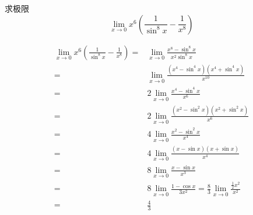 \documentclass[color=green,titlestyle=hang]{elegantbook}%
\begin{document}
\begin{exercise}
求极限\begin{equation*}\lim_{x\to 0}x^6\left(\frac{1}{\sin^8x}-\frac{1}{x^8}\right)\end{equation*}
\end{exercise}\begin{Solution}\begin{align*}
\lim_{x\to 0}x^6\left(\frac{1}{\sin^8x}-\frac{1}{x^8}\right)=&\lim_{x\to 0}\frac{x^8-\sin^8x}{x^2\sin^{8}x}\\
=&\lim_{x\to 0}\frac{(x^4-\sin^4x)(x^4+\sin^4x)}{x^{10}}\\
=&2\lim_{x\to 0}\frac{x^4-\sin^4x}{x^6}\\
=&2\lim_{x\to 0}\frac{(x^2-\sin^2x)(x^2+\sin^2x)}{x^6}\\
=&4\lim_{x\to 0}\frac{x^2-\sin^2x}{x^4}\\
=&4\lim_{x\to 0}\frac{(x-\sin x)(x+\sin x)}{x^4}\\
=&8\lim_{x\to 0}\frac{x-\sin x}{x^3}\\
=&8\lim_{x\to 0}\frac{1-\cos x}{3x^2}=\frac{8}{3}\lim_{x\to 0}\frac{\frac{1}{2}x^2}{x^2}\\
=&\frac{4}{3}
\end{align*}
\end{Solution}
\end{document}
